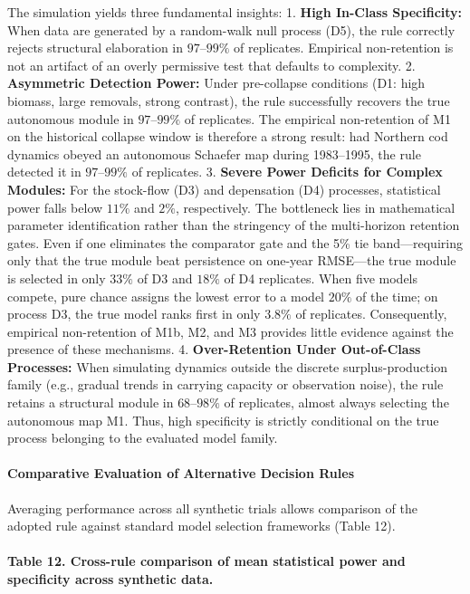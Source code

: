 \documentclass[11pt]{article}
\begin{document}
The simulation yields three fundamental insights: 1. \textbf{High
In-Class Specificity:} When data are generated by a random-walk null
process (D5), the rule correctly rejects structural elaboration in
\(97\text{--}99\%\) of replicates. Empirical non-retention is not an
artifact of an overly permissive test that defaults to complexity. 2.
\textbf{Asymmetric Detection Power:} Under pre-collapse conditions (D1:
high biomass, large removals, strong contrast), the rule successfully
recovers the true autonomous module in \(97\text{--}99\%\) of
replicates. The empirical non-retention of M1 on the historical collapse
window is therefore a strong result: had Northern cod dynamics obeyed an
autonomous Schaefer map during 1983--1995, the rule detected it in
\(97\text{--}99\%\) of replicates. 3. \textbf{Severe Power Deficits for
Complex Modules:} For the stock-flow (D3) and depensation (D4)
processes, statistical power falls below \(11\%\) and \(2\%\),
respectively. The bottleneck lies in mathematical parameter
identification rather than the stringency of the multi-horizon retention
gates. Even if one eliminates the comparator gate and the 5\% tie
band---requiring only that the true module beat persistence on one-year
RMSE---the true module is selected in only \(33\%\) of D3 and \(18\%\)
of D4 replicates. When five models compete, pure chance assigns the
lowest error to a model \(20\%\) of the time; on process D3, the true
model ranks first in only \(3.8\%\) of replicates. Consequently,
empirical non-retention of M1b, M2, and M3 provides little evidence
against the presence of these mechanisms. 4. \textbf{Over-Retention
Under Out-of-Class Processes:} When simulating dynamics outside the
discrete surplus-production family (e.g., gradual trends in carrying
capacity or observation noise), the rule retains a structural module in
\(68\text{--}98\%\) of replicates, almost always selecting the
autonomous map M1. Thus, high specificity is strictly conditional on the
true process belonging to the evaluated model family.

\paragraph{Comparative Evaluation of Alternative Decision
Rules}\label{comparative-evaluation-of-alternative-decision-rules}

Averaging performance across all synthetic trials allows comparison of
the adopted rule against standard model selection frameworks (Table 12).

\paragraph{Table 12. Cross-rule comparison of mean statistical power and
specificity across synthetic
data.}\label{table-12.-cross-rule-comparison-of-mean-statistical-power-and-specificity-across-synthetic-data.}
\end{document}

